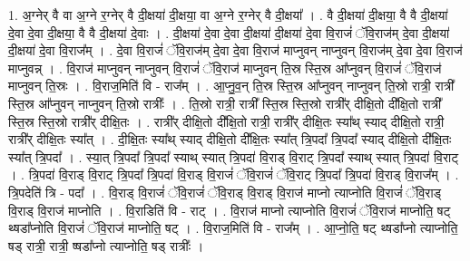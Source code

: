 \documentclass[17pt]{extarticle}
\begin{document}
1. अ॒ग्नेर् वै वा अ॒ग्ने र॒ग्नेर् वै दी॒क्षया॑ दी॒क्षया॒ वा अ॒ग्ने र॒ग्नेर् वै दी॒क्षया᳚ । . वै दी॒क्षया॑ दी॒क्षया॒ वै वै दी॒क्षया॑ दे॒वा दे॒वा दी॒क्षया॒ वै वै दी॒क्षया॑ दे॒वाः । . दी॒क्षया॑ दे॒वा दे॒वा दी॒क्षया॑ दी॒क्षया॑ दे॒वा वि॒राजं॑ ॅवि॒राज॑म् दे॒वा दी॒क्षया॑ दी॒क्षया॑ दे॒वा वि॒राज᳚म् । . दे॒वा वि॒राजं॑ ॅवि॒राज॑म् दे॒वा दे॒वा वि॒राज॑ माप्नुवन् नाप्नुवन् वि॒राज॑म् दे॒वा दे॒वा वि॒राज॑ माप्नुवन्न् । . वि॒राज॑ माप्नुवन् नाप्नुवन् वि॒राजं॑ ॅवि॒राज॑ माप्नुवन् ति॒स्र स्ति॒स्र आ᳚प्नुवन् वि॒राजं॑ ॅवि॒राज॑ माप्नुवन् ति॒स्रः । . वि॒राज॒मिति॑ वि - राज᳚म् । . आ॒प्नु॒व॒न् ति॒स्र स्ति॒स्र आ᳚प्नुवन् नाप्नुवन् ति॒स्रो रात्री॒ रात्री᳚ स्ति॒स्र आ᳚प्नुवन् नाप्नुवन् ति॒स्रो रात्रीः᳚ । . ति॒स्रो रात्री॒ रात्री᳚ स्ति॒स्र स्ति॒स्रो रात्री᳚र् दीक्षि॒तो दी᳚क्षि॒तो रात्री᳚ स्ति॒स्र स्ति॒स्रो रात्री᳚र् दीक्षि॒तः । . रात्री᳚र् दीक्षि॒तो दी᳚क्षि॒तो रात्री॒ रात्री᳚र् दीक्षि॒तः स्या᳚थ् स्याद् दीक्षि॒तो रात्री॒ रात्री᳚र् दीक्षि॒तः स्या᳚त् । . दी॒क्षि॒तः स्या᳚थ् स्याद् दीक्षि॒तो दी᳚क्षि॒तः स्या᳚त् त्रि॒पदा᳚ त्रि॒पदा᳚ स्याद् दीक्षि॒तो दी᳚क्षि॒तः स्या᳚त् त्रि॒पदा᳚ । . स्या॒त् त्रि॒पदा᳚ त्रि॒पदा᳚ स्याथ् स्यात् त्रि॒पदा॑ वि॒राड् वि॒राट् त्रि॒पदा᳚ स्याथ् स्यात् त्रि॒पदा॑ वि॒राट् । . त्रि॒पदा॑ वि॒राड् वि॒राट् त्रि॒पदा᳚ त्रि॒पदा॑ वि॒राड् वि॒राजं॑ ॅवि॒राजं॑ ॅवि॒राट् त्रि॒पदा᳚ त्रि॒पदा॑ वि॒राड् वि॒राज᳚म् । . त्रि॒पदेति॑ त्रि - पदा᳚ । . वि॒राड् वि॒राजं॑ ॅवि॒राजं॑ ॅवि॒राड् वि॒राड् वि॒राज॑ माप्नो त्याप्नोति वि॒राजं॑ ॅवि॒राड् वि॒राड् वि॒राज॑ माप्नोति । . वि॒राडिति॑ वि - राट् । . वि॒राज॑ माप्नो त्याप्नोति वि॒राजं॑ ॅवि॒राज॑ माप्नोति॒ षट् थ्षडा᳚प्नोति वि॒राजं॑ ॅवि॒राज॑ माप्नोति॒ षट् । . वि॒राज॒मिति॑ वि - राज᳚म् । . आ॒प्नो॒ति॒ षट् थ्षडा᳚प्नो त्याप्नोति॒ षड् रात्री॒ रात्री॒ ष्षडा᳚प्नो त्याप्नोति॒ षड् रात्रीः᳚ । \newline
\end{document}

